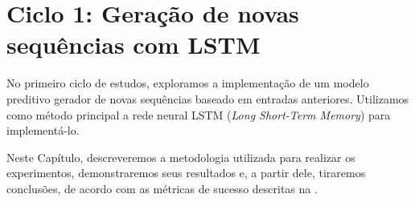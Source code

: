\chapter{Ciclo 1: Geração de novas sequências com LSTM}
\label{chap:lstm}

No primeiro ciclo de estudos, exploramos a implementação de um modelo preditivo gerador de novas sequências baseado em entradas anteriores. Utilizamos como método principal a rede neural LSTM (\textit{Long Short-Term Memory}) para implementá-lo.

Neste Capítulo, descreveremos a metodologia utilizada para realizar os experimentos, demonstraremos seus resultados e, a partir dele, tiraremos conclusões, de acordo com as métricas de sucesso descritas na .